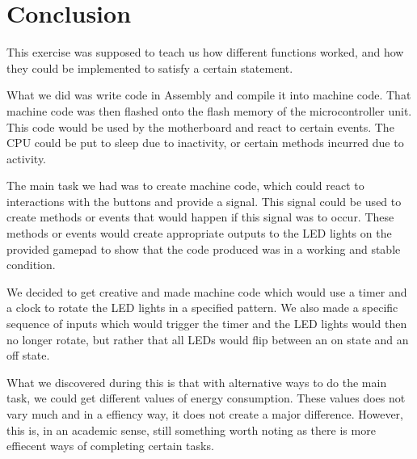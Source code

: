 \chapter{Conclusion}
This exercise was supposed to teach us how different functions worked,
and how they could be implemented to satisfy a certain statement.

What we did was write code in Assembly and compile it into machine code. That machine code was then flashed onto the flash memory of the microcontroller unit. This code would be used by the motherboard and react to certain events. The CPU could be put to sleep due to inactivity, or certain methods incurred due to activity.

The main task we had was to create machine code, which could react to interactions with the buttons and provide a signal. This signal could be used to create methods or events that would happen if this signal was to occur. These methods or events would create appropriate outputs to the LED lights on the provided gamepad to show that the code produced was in a working and stable condition.

We decided to get creative and made machine code which would use a timer and
a clock to rotate the LED lights in a specified pattern. We also made a specific 
sequence of inputs which would trigger the timer and the LED lights would then 
no longer rotate, but rather that all LEDs would flip between an on state and
an off state.

What we discovered during this is that with alternative ways to do 
the main task, we could get different values of energy consumption. These values 
does not vary much and in a effiency way, it does not create a major difference. 
However, this is, in an academic sense, still something worth noting as there is 
more effiecent ways of completing certain tasks. 

